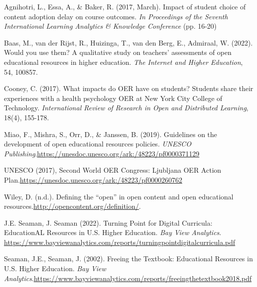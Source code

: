 \documentclass[11pt]{article}
\begin{document}
\begin{thebibliography}{99}

   Agnihotri, L., Essa, A., \& Baker, R. (2017, March). Impact of student choice of content adoption delay on course outcomes. {\em In Proceedings of the Seventh International Learning Analytics \& Knowledge Conference} (pp. 16-20)

   Baas, M., van der Rijst, R., Huizinga, T., van den Berg, E., Admiraal, W. (2022). Would you use them? A qualitative study on teachers' assessments of open educational resources in higher education. {\em The Internet and Higher Education}, 54, 100857.

   Cooney, C. (2017). What impacts do OER have on students? Students share their experiences with a health psychology OER at New York City College of Technology. {\em International Review of Research in Open and Distributed Learning}, 18(4), 155-178.

   Miao, F., Mishra, S., Orr, D., \& Janssen, B. (2019). Guidelines on the development of open educational resources policies. {\em UNESCO Publishing}.\newline \href{https://unesdoc.unesco.org/ark:/48223/pf0000371129}{https://unesdoc.unesco.org/ark:/48223/pf0000371129}

   UNESCO (2017), Second World OER Congress: Ljubljana OER Action Plan.\newline \href{https://unesdoc.unesco.org/ark:/48223/pf0000260762}{https://unesdoc.unesco.org/ark:/48223/pf0000260762}

   Wiley, D. (n.d.). Defining the ``open'' in open content and open educational resources.\newline \href{http://opencontent.org/definition/}{http://opencontent.org/definition/}.

   J.E. Seaman, J. Seaman (2022). Turning Point for Digital Curricula: EducationAL Resources in U.S. Higher Education. {\em Bay View Analytics}. \newline \href{https://www.bayviewanalytics.com/reports/turningpointdigitalcurricula.pdf}{https://www.bayviewanalytics.com/reports/turningpointdigitalcurricula.pdf}

   Seaman, J.E., Seaman, J. (2002). Freeing the Textbook: Educational Resources in U.S. Higher Education. {\em Bay View Analytics}.\newline \href{https://www.bayviewanalytics.com/reports/freeingthetextbook2018.pdf}{https://www.bayviewanalytics.com/reports/freeingthetextbook2018.pdf}


\end{thebibliography}
\end{document}
